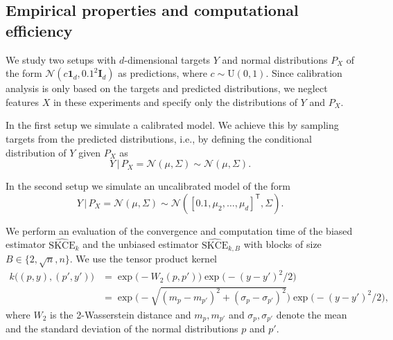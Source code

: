 \documentclass{article}
\begin{document}
\subsection{Empirical properties and computational efficiency}

We study two setups with $d$-dimensional targets $Y$ and normal distributions $P_X$
of the form $\mathcal{N}(c \mathbf{1}_d, 0.1^2 \mathbf{I}_d)$ as predictions,
where $c \sim \mathrm{U}(0, 1)$.
Since calibration analysis is only based on the targets and predicted distributions,
we neglect features $X$ in these experiments and specify only the distributions of
$Y$ and $P_X$.

In the first setup we simulate a calibrated model. We achieve this by sampling
targets from the predicted distributions, i.e., by defining the conditional
distribution of $Y$ given $P_X$ as
\begin{equation*}
    Y \,|\, P_X = \mathcal{N}(\mu, \Sigma) \sim \mathcal{N}(\mu, \Sigma).
\end{equation*}

In the second setup we simulate an uncalibrated model of the form
\begin{equation*}
    Y \,|\, P_X = \mathcal{N}(\mu, \Sigma) \sim \mathcal{N}([0.1, \mu_2, \ldots, \mu_d]^{\mathsf{T}}, \Sigma).
\end{equation*}

We perform an evaluation of the convergence and computation time of the biased estimator
$\widehat{\mathrm{SKCE}}_k$ and the unbiased estimator $\widehat{\mathrm{SKCE}}_{k,B}$ with
blocks of size $B \in \{2, \sqrt{n}, n\}$. We use the tensor product kernel
\begin{equation*}
\begin{split}
    k\big((p, y), (p', y')\big) &= \exp{\big(- W_2(p, p')\big)} \exp{\big(-(y - y')^2/2\big)} \\
    &= \exp{\bigg(-\sqrt{(m_p - m_{p'})^2 + (\sigma_p - \sigma_{p'})^2}\bigg)} \exp{\big( - (y - y')^2/2\big)},
\end{split}
\end{equation*}
where $W_2$ is the 2-Wasserstein distance and $m_p, m_{p'}$ and $\sigma_p, \sigma_{p'}$
denote the mean and the standard deviation of the normal distributions $p$ and $p'$.
\end{document}

